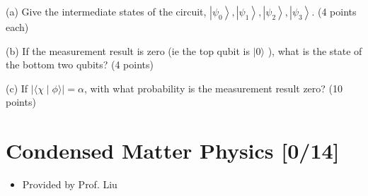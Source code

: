 \documentclass[11pt]{article}
\begin{document}
(a) Give the intermediate states of the circuit,
\(\left|\psi_0\right\rangle,\left|\psi_1\right\rangle,\left|\psi_2\right\rangle,\left|\psi_3\right\rangle\).
(4 points each)

(b) If the measurement result is zero (ie the top qubit is \(|0\rangle\) ), what
is the state of the bottom two qubits? (4 points)

(c) If \(|\langle\chi \mid \phi\rangle|=\alpha\), with what probability is the
measurement result zero? (10 points)
\section{Condensed Matter Physics [0/14]}
\label{sec:org7070cff}
\begin{itemize}
\item Provided by Prof. Liu
\end{itemize}
\end{document}
